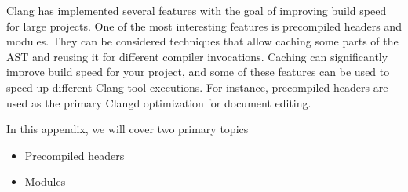Clang has implemented several features with the goal of improving build speed for large projects. One of the most interesting features is precompiled headers and modules. They can be considered techniques that allow caching some parts of the AST and reusing it for different compiler invocations. Caching can significantly improve build speed for your project, and some of these features can be used to speed up different Clang tool executions. For instance, precompiled headers are used as the primary Clangd optimization for document editing.

In this appendix, we will cover two primary topics

\begin{itemize}
\item
Precompiled headers

\item
Modules
\end{itemize}

